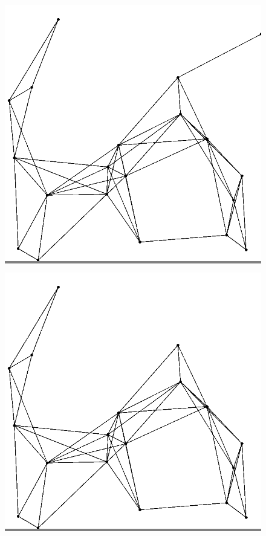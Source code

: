 \documentclass{article}
\begin{document}
        \begin{figure}
            \begin{minipage}{0.2\textwidth}
            \colorbox{gray}{\includegraphics[width=\linewidth]{./images/slvo-0.png}}
            \end{minipage}
            \hspace{\fill}
            \begin{minipage}{0.2\textwidth}
            \colorbox{gray}{\includegraphics[width=\linewidth]{./images/slvo-1.png}}

\end{minipage}
\end{figure}
\end{document}
